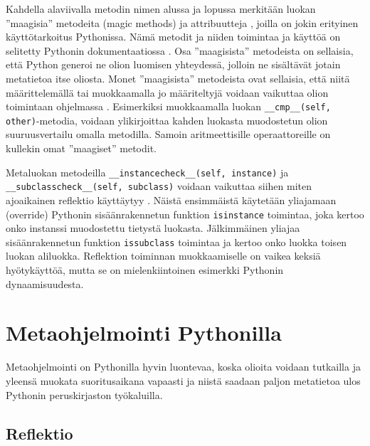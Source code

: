 \documentclass[finnish]{tktltiki2}
\theoremstyle{definition}
\theoremstyle{remark}
\begin{document}
Kahdella alaviivalla metodin nimen alussa ja lopussa merkitään luokan ''maagisia'' metodeita (magic methods) ja attribuutteja \cite{martelli2006python}, joilla on jokin erityinen käyttötarkoitus Pythonissa. Nämä metodit ja niiden toimintaa ja käyttöä on selitetty Pythonin dokumentaatiossa \cite{magic-methods}. Osa ''maagisista'' metodeista on sellaisia, että Python generoi ne olion luomisen yhteydessä, jolloin ne sisältävät jotain metatietoa itse oliosta. Monet ''maagisista'' metodeista ovat sellaisia, että niitä määrittelemällä tai muokkaamalla jo määriteltyjä voidaan vaikuttaa olion toimintaan ohjelmassa \cite{magic-methods}. Esimerkiksi muokkaamalla luokan \verb|__cmp__(self, other)|-metodia, voidaan ylikirjoittaa kahden luokasta muodostetun olion suuruusvertailu omalla metodilla. Samoin aritmeettisille operaattoreille on kullekin omat ''maagiset'' metodit. 

Metaluokan metodeilla \verb|__instancecheck__(self, instance)| ja \verb|__subclasscheck__(self, subclass)| voidaan vaikuttaa siihen miten ajoaikainen reflektio käyttäytyy \cite{magic-methods, Python-docs}. Näistä ensimmäistä käytetään yliajamaan (override) Pythonin sisäänrakennetun funktion \verb|isinstance| toimintaa, joka kertoo onko instanssi muodostettu tietystä luokasta. Jälkimmäinen yliajaa sisäänrakennetun funktion \verb|issubclass| toimintaa ja kertoo onko luokka toisen luokan aliluokka. Reflektion toiminnan muokkaamiselle on vaikea keksiä hyötykäyttöä, mutta se on mielenkiintoinen esimerkki Pythonin dynaamisuudesta.



\section{Metaohjelmointi Pythonilla}

Metaohjelmointi on Pythonilla hyvin luontevaa, koska olioita voidaan tutkailla ja yleensä muokata suoritusaikana vapaasti ja niistä saadaan paljon metatietoa ulos Pythonin peruskirjaston työkaluilla.


\subsection{Reflektio}


\end{document}
